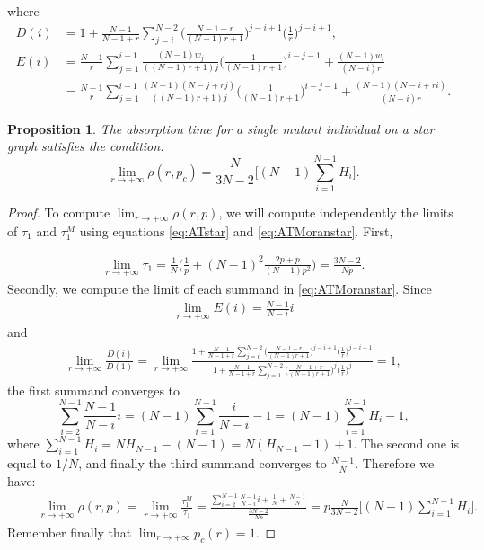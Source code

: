\documentclass[a4paper,english,10pt]{amsart}
\newtheorem{proposition}{\bf Proposition}[section]
\theoremstyle{definition}
\numberwithin{equation}{section}
\newcommand{\red}{\color{red!50!black}}
\begin{document}
where
\begin{align*}
D(i)  &  = 1 + \frac{N-1}{N-1+r} \sum_{j=i}^{N-2}  \Big(\frac{N-1+r}{(N-1)r+1}\Big)^{j-i+1} \Big(\frac{1}{r}\Big)^{j-i+1}, \\
E(i)  & = \frac{N-1}{r} \sum_{j=1}^{i-1} \frac{(N-1)w_j}{((N-1)r + 1)j} \big(\frac{1}{(N-1)r+1}  \big)^{i-j-1}  + \frac{(N-1)w_i}{(N-i)r} \\ 
& = \frac{N-1}{r} \sum_{j=1}^{i-1} \frac{(N-1)(N-j+rj)}{((N-1)r + 1)j} \big(\frac{1}{(N-1)r+1}  \big)^{i-j-1}  + \frac{(N-1)(N-i+ri)}{(N-i)r}.
\end{align*}


\begin{proposition} \label{prop:AR_star}
The absorption time for a single mutant individual on a star graph satisfies the condition:  
$$
\lim_{r \to +\infty} \rho(r,p_c)  = \frac{N}{3N-2} 
\big[ (N-1) \sum_{i=1}^{N-1} H_ i \big].
$$
\end{proposition}

\begin{proof} To compute 
$\lim_{r \to +\infty} \rho(r,p)$,
we will compute independently the limits of $\tau_1$ and $\tau_1^M$ using 
equations \eqref{eq:ATstar} and \eqref{eq:ATMoranstar}. First, 

\begin{align*}
\lim_{r \to +\infty} \tau_1 = \frac 1 N \Big( \frac 1 p + (N-1)^2 \frac{2p + p}{(N-1)p^2} \Big) 
= \frac{3N-2}{Np}.
\end{align*}
Secondly, we compute the limit of each summand in \eqref{eq:ATMoranstar}. Since 
\begin{align*}
\lim_{r \to +\infty} E(i) = \frac{N-1}{N-i}i 
\end{align*}
and 
\begin{align*}
\lim_{r \to +\infty} \frac{D(i)}{D(1)}   = 
\lim_{r \to +\infty}  \frac{\displaystyle 1 + \frac{N-1}{N-1+r} \sum_{j=i}^{N-2}  \Big(\frac{N-1+r}{(N-1)r+1}\Big)^{j-i+1} \Big(\frac{1}{r}\Big)^{j-i+1}}{\displaystyle 1 + \frac{N-1}{N-1+r} \sum_{j=1}^{N-2}  \Big(\frac{N-1+r}{(N-1)r+1}\Big)^{j} \Big(\frac{1}{r}\Big)^{j}} = 1,
\end{align*}
the first summand converges to 
$$
\sum_{i=2}^{N-1} \frac{N-1}{N-i}i =  (N-1) \sum_{i=1}^{N-1} \frac{i}{N-i} - 1 = (N-1) \sum_{i=1}^{N-1} H_ i -1,
$$
where 
$\sum_{i=1}^{N-1} H_ i = NH_{N-1} - (N-1) = N(H_{N-1}-1) +1$.
The second one is equal to $1/N$, and finally the third summand converges to $\frac{N-1}{N}$. Therefore we have:
\begin{align*}
\qquad \lim_{r \to +\infty} \rho(r,p) = \lim_{r \to +\infty} \frac{\tau_1^M}{\tau_1} 
 = \frac{\displaystyle \sum_{ i=2}^{N-1} \frac{N-1}{N-i} i  + \frac 1 N + \frac{N-1}{N}}{\displaystyle \frac{3N-2}{Np}} 
= p \frac{N}{3N-2} \big[ (N-1)
\sum_{i=1}^{N-1} H_ i \big]. \hspace{3em} 
\end{align*}
Remember finally that $\lim_{r \rightarrow + \infty} p_{c}(r) = 1$. 
\end{proof} 
\end{document}
